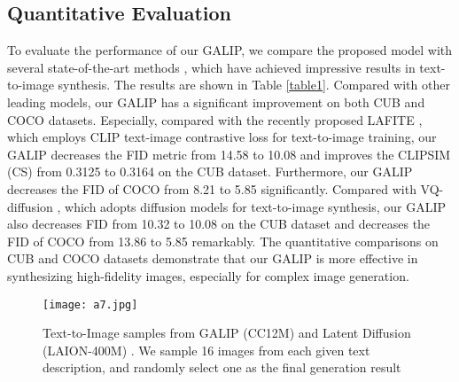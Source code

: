 \documentclass[10pt,twocolumn,letterpaper]{article}
\begin{document}
\subsection{Quantitative Evaluation}
To evaluate the performance of our GALIP, we compare the proposed model with several state-of-the-art methods \cite{zhu2019dm,zhang2021cross,ruan2021dae,zhou2022towards,tao2020df,gu2022vector}, which have achieved impressive results in text-to-image synthesis. The results are shown in Table \ref{table1}.
Compared with other leading models, our GALIP has a significant improvement on both CUB and COCO datasets.
Especially, compared with the recently proposed LAFITE \cite{zhou2022towards}, which employs CLIP text-image contrastive loss for text-to-image training, 
our GALIP decreases the FID metric from 14.58 to 10.08 and improves the CLIPSIM (CS) from 0.3125 to 0.3164 on the CUB dataset. 
Furthermore, our GALIP decreases the FID of COCO from 8.21 to 5.85 significantly.
Compared with VQ-diffusion \cite{gu2022vector}, which adopts diffusion models for text-to-image synthesis, 
our GALIP also decreases FID from 10.32 to 10.08 on the CUB dataset and decreases the FID of COCO from 13.86 to 5.85 remarkably.
The quantitative comparisons on CUB and COCO datasets demonstrate that our GALIP is more effective in synthesizing high-fidelity images, especially for complex image generation.


\begin{figure*}[t] \small
  \centering
  \texttt{[image: a7.jpg]}
  \caption{Text-to-Image samples from GALIP (CC12M) and Latent Diffusion (LAION-400M) \cite{rombach2022high,stablediff}. We sample 16 images from each given text description, and randomly select one as the final generation result}
  \label{fig6}
  \vspace{-0.4cm}
\end{figure*}
\end{document}
